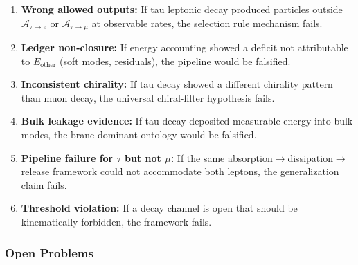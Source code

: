 \begin{tcolorbox}[falsifiability, title=\textbf{Falsifiability: What Would Refute This Framing?}]
\begin{enumerate}[nosep]
    \item \textbf{Wrong allowed outputs:} If tau leptonic decay produced
          particles outside $\mathcal{A}_{\tau \to e}$ or $\mathcal{A}_{\tau \to \mu}$
          at observable rates, the selection rule mechanism fails.

    \item \textbf{Ledger non-closure:} If energy accounting showed a deficit
          not attributable to $E_{\mathrm{other}}$ (soft modes, residuals),
          the pipeline would be falsified.

    \item \textbf{Inconsistent chirality:} If tau decay showed a different
          chirality pattern than muon decay, the universal chiral-filter
          hypothesis fails.

    \item \textbf{Bulk leakage evidence:} If tau decay deposited measurable
          energy into bulk modes, the brane-dominant ontology would be
          falsified.

    \item \textbf{Pipeline failure for $\tau$ but not $\mu$:} If the same
          absorption$\to$dissipation$\to$release framework could not
          accommodate both leptons, the generalization claim fails.

    \item \textbf{Threshold violation:} If a decay channel is open that
          should be kinematically forbidden, the framework fails.
\end{enumerate}
\end{tcolorbox}


\subsubsection{Open Problems}

